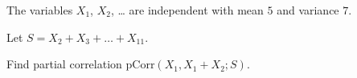 
\begin{question}
The variables \(X_1\), \(X_2\), \ldots{} are independent with mean \(5\) and variance \(7\).

Let \(S = X_{2} + X_{3} + \ldots + X_{11}\).

Find partial correlation \(\mathrm{pCorr}(X_1, X_1 + X_2; S)\).
\end{question}


